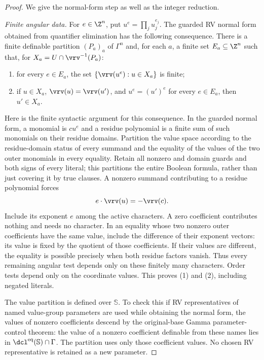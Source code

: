 \begin{proof}
We give the normal-form step as well as the integer reduction.

\emph{Finite angular data.}
For $e\in\Z^n$, put $u^e=\prod_j u_j^{e_j}$.
The guarded RV normal form obtained from quantifier elimination has
the following consequence. There is a finite definable partition
$(P_a)_a$ of $\Gamma^n$ and, for each $a$, a finite set
$E_a\subseteq\Z^n$ such that, for $X_a=U\cap\vrv^{-1}(P_a)$:
\begin{enumerate}
\item for every $e\in E_a$, the set
$\{\vrv(u^e):u\in X_a\}$ is finite;
\item if $u\in X_a$, $\vrv(u)=\vrv(u')$, and
$u^e=(u')^e$ for every $e\in E_a$, then $u'\in X_a$.
\end{enumerate}
Here is the finite syntactic argument for this consequence.
In the guarded normal form, a monomial is $c u^e$ and a residue
polynomial is a finite sum of such monomials on their residue
domains. Partition the value space according to the residue-domain
status of every summand and the equality of the values of the two
outer monomials in every equality. Retain all nonzero and domain
guards and both signs of every literal; this partitions the entire
Boolean formula, rather than just covering it by true clauses.
A nonzero summand contributing to a residue polynomial forces
\[
 e\cdot\vrv(u)=-\vrv(c).
\]
Include its exponent $e$ among the active characters. A zero
coefficient contributes nothing and needs no character.
In an equality whose two nonzero outer coefficients have the same
value, include the difference of their exponent vectors: its value
is fixed by the quotient of those coefficients. If their values are
different, the equality is possible precisely when both residue
factors vanish. Thus every remaining angular test depends only on
these finitely many characters. Order tests depend only on the
coordinate values. This proves (1) and (2), including negated
literals.

The value partition is defined over $\mathbb S$. To check this if RV
representatives of named value-group parameters are used while
obtaining the normal form, the values of nonzero coefficients
descend by the original-base Gamma parameter-control theorem:
the value of a nonzero coefficient definable from these names
lies in $\dcl^{\mathrm{eq}}(\mathbb S)\cap\Gamma$.
The partition uses only those coefficient values. No chosen
RV representative is retained as a new parameter.


\end{proof}
